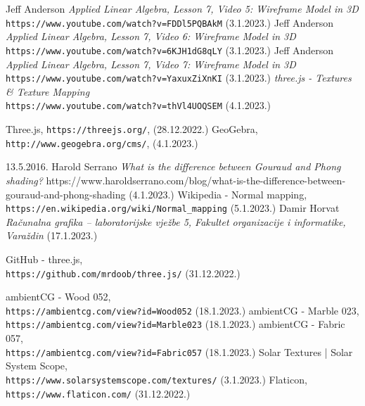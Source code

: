\documentclass[a4paper,12pt]{article}
\begin{document}
\begin{thebibliography}{9}

 Jeff Anderson \emph{Applied Linear Algebra, Lesson 7, Video 5: Wireframe Model in 3D} \texttt{https://www.youtube.com/watch?v=FDDl5PQBAkM} (3.1.2023.)
 Jeff Anderson \emph{Applied Linear Algebra, Lesson 7, Video 6: Wireframe Model in 3D} \texttt{https://www.youtube.com/watch?v=6KJH1dG8qLY} (3.1.2023.)
 Jeff Anderson \emph{Applied Linear Algebra, Lesson 7, Video 7: Wireframe Model in 3D} \texttt{https://www.youtube.com/watch?v=YaxuxZiXnKI} (3.1.2023.)
 \emph{three.js - Textures \& Texture Mapping}\\\texttt{https://www.youtube.com/watch?v=thVl4UOQSEM} (4.1.2023.)

 Three.js, \texttt{https://threejs.org/}, (28.12.2022.)
 GeoGebra, \texttt{http://www.geogebra.org/cms/}, (4.1.2023.)

  13.5.2016. Harold Serrano \emph{What is the difference between Gouraud and Phong shading?} https://www.haroldserrano.com/blog/what-is-the-difference-between-gouraud-and-phong-shading (4.1.2023.)
 Wikipedia - Normal mapping,\\\texttt{https://en.wikipedia.org/wiki/Normal\_mapping} (5.1.2023.)
 Damir Horvat \emph{Računalna grafika – laboratorijske vježbe 5, Fakultet organizacije i informatike, Varaždin} (17.1.2023.)



 GitHub - three.js,\\\texttt{https://github.com/mrdoob/three.js/} (31.12.2022.)

 ambientCG - Wood 052,\\\texttt{https://ambientcg.com/view?id=Wood052} (18.1.2023.)
 ambientCG - Marble 023,\\\texttt{https://ambientcg.com/view?id=Marble023} (18.1.2023.)
 ambientCG - Fabric 057,\\\texttt{https://ambientcg.com/view?id=Fabric057} (18.1.2023.)
 Solar Textures | Solar System Scope,\\\texttt{https://www.solarsystemscope.com/textures/} (3.1.2023.)
 Flaticon,\\\texttt{https://www.flaticon.com/} (31.12.2022.)




\end{thebibliography}
\end{document}
